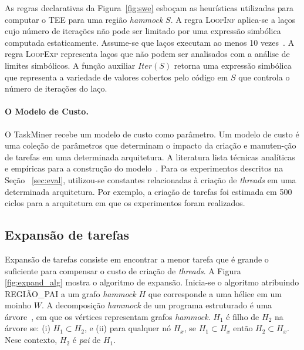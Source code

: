 \documentclass[sigconf]{acmart}
\newcommand\Taskminer{\mbox{\textsf{TaskMiner}}}
\begin{document}
As regras declarativas da Figura~\ref{fig:swe} esboçam as heurísticas
utilizadas para computar o TEE para uma região {\em hammock} $S$.
A regra \textsc{LoopInf} aplica-se a laços cujo número de iterações não
pode ser limitado por uma expressão simbólica computada estaticamente.
Assume-se que laços executam ao menos 10 vezes~\cite{Wu94}.
A regra \textsc{LoopExp} representa laços que não podem ser analisados 
com a análise de limites simbólicos. A função auxiliar $\mathit{Iter}(S)$ 
retorna uma expressão simbólica que representa a variedade de valores
cobertos pelo código em $S$ que controla o número de iterações do laço.

\paragraph{O Modelo de Custo.}
O {\Taskminer} recebe um modelo de custo como parâmetro.
Um modelo de custo é uma coleção de parâmetros que determinam o impacto
da criação e manuten-\c{c}\~{a}o de tarefas em uma determinada arquitetura.
A literatura lista técnicas analíticas e empíricas
para a construção do modelo~\cite{Poesia17}. 
Para os experimentos descritos na Seção ~\ref{sec:eval}, utilizou-se constantes
relacionadas à criação de {\em threads} em uma determinada arquitetura. Por exemplo,
a criação de tarefas foi estimada em 500 ciclos para a arquitetura em que os experimentos
foram realizados.

\subsection{Expansão de tarefas}
\label{sub:expansion}

Expansão de tarefas consiste em encontrar a menor tarefa que é grande o suficiente
para compensar o custo de criação de {\em threads}. A Figura \ref{fig:expand_alg}
mostra o algoritmo de expansão. Inicia-se o algoritmo atribuindo \textsf{REGIÃO\_PAI} a
um grafo {\em hammock} $H$ que corresponde a uma hélice em um moinho $W$.
A decomposição {\em hammock} de um programa estruturado é uma árvore~\cite{Ferrante87},
em que os vértices representam grafos {\em hammock}.
$H_1$ é filho de $H_2$ na árvore se:
(i) $H_1 \subset H_2$, e (ii) para qualquer 
nó $H_x$, se $H_1 \subset H_x$ então $H_2 \subset H_x$.
Nese contexto, $H_2$ é {\em pai} de $H_1$.
\end{document}
